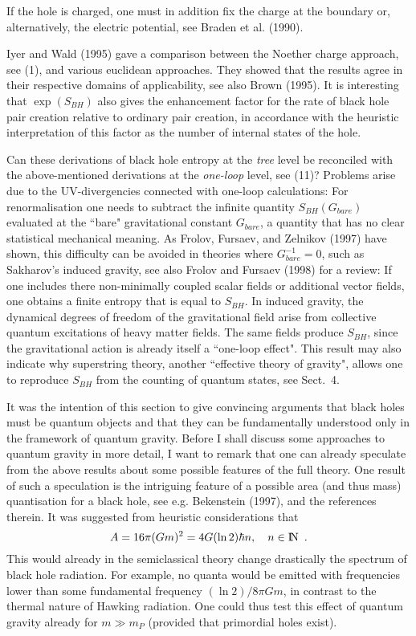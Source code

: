 \documentclass[12pt]{article}
\def\bbbn{{\rm I\!N}} %
\newcommand{\be}{\begin{equation}}
\newcommand{\ee}{\end{equation}}
\begin{document}
If the hole is charged, one must in addition fix the charge at the
boundary or, alternatively, the electric potential, see
Braden et al. (1990).

\vskip 2mm

Iyer and Wald (1995) gave a comparison between
the Noether charge approach, see (1), and various euclidean
approaches. They showed that the results agree in their respective
domains of applicability, see also Brown (1995).
It is interesting that $\exp(S_{BH})$ also gives the
enhancement factor for the rate of black hole pair creation
relative to ordinary pair creation, in accordance with
the heuristic interpretation of this factor as the number of internal
states of the hole.

\vskip 2mm
\normalsize
Can these derivations of black hole entropy at the {\em tree} level
be reconciled with the above-mentioned derivations at the
{\em one-loop} level, see (11)? Problems arise due to the 
UV-divergencies connected with one-loop calculations:
For renormalisation one needs to subtract the infinite quantity
$S_{BH}(G_{bare})$ evaluated at the ``bare" gravitational constant
$G_{bare}$, a quantity that has no clear statistical mechanical meaning.
As Frolov, Fursaev, and Zelnikov (1997) have shown, this difficulty
can be avoided in theories where $G_{bare}^{-1}=0$, such as
Sakharov's induced gravity, see also Frolov and Fursaev (1998)
for a review: If one includes there non-minimally coupled scalar fields
or additional vector fields, one obtains a finite entropy
that is equal to $S_{BH}$. In induced gravity, the dynamical degrees
of freedom of the gravitational field arise from collective
quantum excitations of heavy matter fields. The same fields
produce $S_{BH}$, since the gravitational action is already itself
a ``one-loop effect". This result may also indicate why
superstring theory, another ``effective theory of gravity",
allows one to reproduce $S_{BH}$ from the counting of
quantum states, see Sect.~4.

It was the intention of this section to give convincing arguments
that black holes must be quantum objects and that they can be
fundamentally understood only in the framework of quantum gravity.
Before I shall discuss some approaches to quantum gravity
in more detail, I want to remark that one can already speculate
from the above results about some possible features of the
full theory. One result of such a speculation is the intriguing
feature of a possible area (and thus mass) quantisation for
a black hole, see e.g. Bekenstein (1997), and the references 
therein. It was suggested from heuristic considerations that
\be A=16\pi(Gm)^2=4G(\ln 2)\hbar n, \quad n\in\bbbn \enspace .\ee
This would already in the semiclassical theory change drastically
the spectrum of black hole radiation. For example, no quanta
would be emitted with frequencies lower than some fundamental
frequency $(\ln 2)/8\pi Gm$, in contrast to the thermal nature
of Hawking radiation. One could thus test this effect of quantum gravity
already for $m\gg m_P$ (provided that primordial holes exist).
\end{document}
